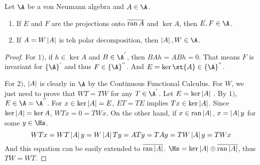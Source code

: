 \begin{prop}
	Let $\A$ be a von Neumann algebra and $A \in \A$.
	\begin{enumerate}[label=\arabic*)]
		\item If $E$ and $F$ are the projections onto $\overline{\operatorname{ran}{A}}$ and $\ker{A}$, then $E,F \in \A$.
		\item If $A = W\left\lvert A\right\lvert$ is teh polar decomposition, then $\abs{A},W \in \A$.
	\end{enumerate}
\end{prop}
\begin{proof}
	For $1)$, if $h \in \ker{A}$ and $B \in \A^{'}$, then $BAh = ABh = 0$. That means $F$ is invariant for $\{\A\}^{'}$ and thus $F \in \{\A\}^{''}$. And $E = \ker{\st{A}} \in \{\A\}^{''}$.
	\item For $2)$, $\left\lvert A\right\lvert$ is clearly in $\A$ by the Continuous Functional Calculus. For $W$, we just need to prove that $WT=TW$ for any $T \in \A^{'}$. Let $E = \ker{\left\lvert A\right\lvert}$ . By $1)$, $E \in \A = \A^{''}$. For $x \in \ker{\left\lvert A\right\lvert} = E$, $ET=TE$ implies $Tx \in \ker{\left\lvert A\right\lvert}$. Since $\ker{\left\lvert A\right\lvert} = \ker{A}$, $WTx =0 = TWx$. On the other hand, if $x \in \operatorname{ran}{\left\lvert A\right\lvert}$, $x = \left\lvert A\right\lvert y$ for some $y \in \Hs$.
	\begin{equation*}
		WTx = WT\left\lvert A\right\lvert y = W\left\lvert A\right\lvert Ty = ATy= TAy = TW\left\lvert A\right\lvert y = TWx
	\end{equation*} 
	And this equation can be easily extended to $\overline{\operatorname{ran}{\left\lvert A\right\lvert}}$. $\Hs = \ker{\abs{A}} \oplus \clo{\ran{\abs{A}}}$, thus $TW=WT$.
\end{proof}

